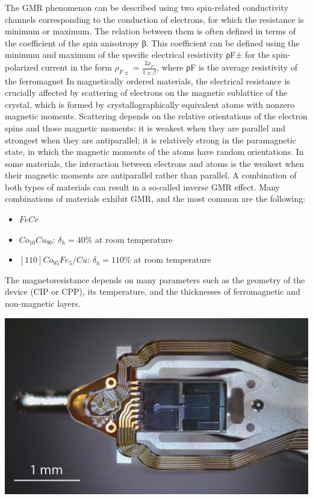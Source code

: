 \documentclass{article}
\begin{document}
The GMR phenomenon can be described using two spin-related conductivity channels corresponding to the conduction of electrons, for which the resistance is minimum or maximum. The relation between them is often defined in terms of the coefficient of the spin anisotropy β. This coefficient can be defined using the minimum and maximum of the specific electrical resistivity ρF± for the spin-polarized current in the form
$\displaystyle \rho _{F\pm }={\frac {2\rho _{F}}{1\pm \beta }}$, 
where ρF is the average resistivity of the ferromagnet
In magnetically ordered materials, the electrical resistance is crucially affected by scattering of electrons on the magnetic sublattice of the crystal, which is formed by crystallographically equivalent atoms with nonzero magnetic moments. Scattering depends on the relative orientations of the electron spins and those magnetic moments: it is weakest when they are parallel and strongest when they are antiparallel; it is relatively strong in the paramagnetic state, in which the magnetic moments of the atoms have random orientations. In some materials, the interaction between electrons and atoms is the weakest when their magnetic moments are antiparallel rather than parallel. A combination of both types of materials can result in a so-called inverse GMR effect.
Many combinations of materials exhibit GMR, and the most common are the following:

\begin{itemize}
    \item $FeCr$
    \item $Co_{10}Cu_{90}$: $\delta_{h}= 40\%$ at room temperature
    \item $[110]Co_{95}Fe_{5}/Cu$: $\delta_{h} = 110\%$ at room temperature
\end{itemize}

The magnetoresistance depends on many parameters such as the geometry of the device (CIP or CPP), its temperature, and the thicknesses of ferromagnetic and non-magnetic layers.

\begin{center}
    \includegraphics[scale=8]{HDD_read-write_head.jpg}
\end{center}
\end{document}
